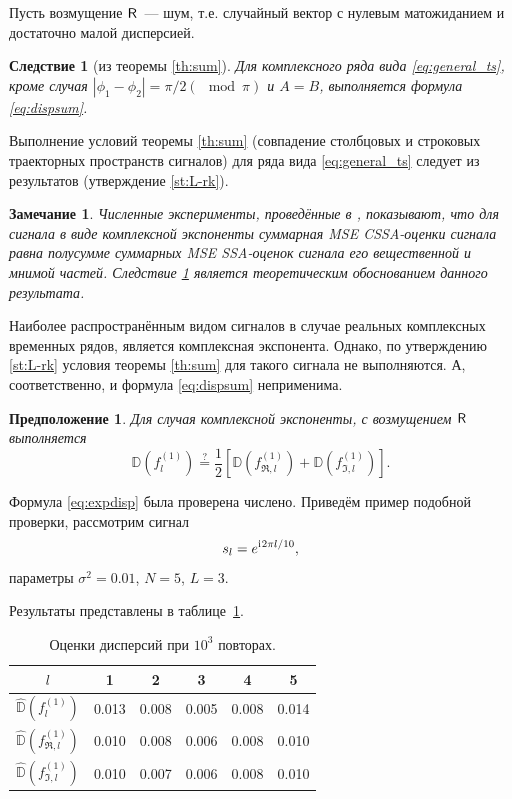 \documentclass[specialist,
               substylefile = spbu.rtx,
               subf,href,colorlinks=true, 12pt]{disser}
\newtheorem{remark}{Замечание}
\newtheorem{corollary}{Следствие}
\newtheorem*{prop*}{Предположение}
\begin{document}
Пусть возмущение $\textsf{R}$~--- шум, т.е. случайный вектор с нулевым матожиданием и достаточно малой дисперсией.

\begin{corollary}[из теоремы {\ref{th:sum}}] \label{cor:harm}
	Для комплексного ряда вида \eqref{eq:general_ts}, кроме случая $|\phi_1-\phi_2| = \pi/2 (\mod \pi)$ и $A=B$,  выполняется формула \eqref{eq:dispsum}.
\end{corollary}
Выполнение условий теоремы {\ref{th:sum}} (совпадение столбцовых и строковых траекторных пространств сигналов) для ряда вида \eqref{eq:general_ts} следует из результатов \cite{Golyandina.Stepanov2005}(утверждение \ref{st:L-rk}).

\begin{remark}
	Численные эксперименты, проведённые в \cite{Golyandina.etal2013}, показывают, что для сигнала в виде комплексной экспоненты суммарная MSE CSSA-оценки сигнала равна полусумме суммарных MSE SSA-оценок сигнала его вещественной и мнимой частей. Следствие \ref{cor:harm} является теоретическим обоснованием данного результата.
\end{remark}

Наиболее распространённым видом сигналов в случае реальных комплексных временных рядов, является комплексная экспонента. Однако, по утверждению \ref{st:L-rk} условия теоремы \ref{th:sum} для такого сигнала не выполняются. А, соответственно, и формула \eqref{eq:dispsum} неприменима. 

\begin{prop*}
	Для случая комплексной экспоненты, с возмущением $\textsf{R}$ выполняется
	\begin{equation} \label{eq:expdisp}
		\mathbb{D}(f^{(1)}_l) \stackrel{?}{=} \frac{1}{2}[\mathbb{D}(f^{(1)}_{\Re, l}) + \mathbb{D}(f^{(1)}_{\Im, l})].
	\end{equation}
\end{prop*}

Формула \eqref{eq:expdisp} была проверена числено. Приведём пример подобной проверки, рассмотрим сигнал
$$s_l = e^{\mathrm{i}\mkern1mu 2 \pi l / 10},$$
параметры $\sigma^2 = 0.01$, $N = 5$, $L = 3$.

Результаты представлены в таблице~\ref{tab:pi_div_2}.

\begin{table}[H]
	\begin{center}
		\caption{Оценки дисперсий при $10^3$ повторах.}
		\label{tab:pi_div_2}
		\begin{tabular}{|c|c|c|c|c|c|}
			\hline
			$l$	& 1 & 2 & 3 & 4 & 5\\
			\hline
			$\hat{\mathbb{D}}(f^{(1)}_l)$ & 0.013  & 0.008  & 0.005 & 0.008 & 0.014\\
			\hline
			$\hat{\mathbb{D}}(f^{(1)}_{\Re, l})$	& 0.010 & 0.008 & 0.006 & 0.008 & 0.010\\
			\hline
			$\hat{\mathbb{D}}(f^{(1)}_{\Im, l})$ & 0.010  & 0.007  & 0.006 & 0.008 & 0.010\\
			\hline
		\end{tabular}
	\end{center}
\end{table}
\end{document}
